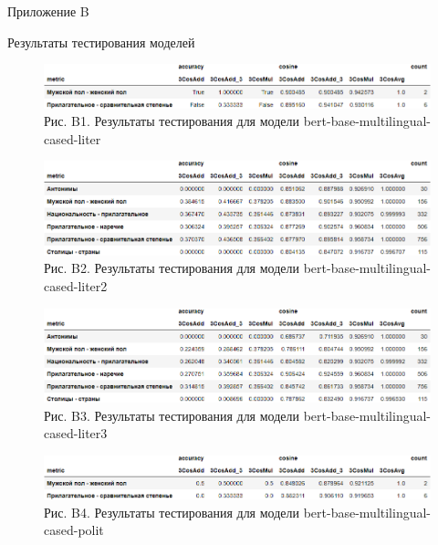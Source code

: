 \documentclass[a4paper,14pt]{article}
\begin{document}
\newpage


\begin{flushright}
	Приложение B
\end{flushright}

\begin{center}
	 Результаты тестирования моделей
\end{center}



\begin{figure}[H]
	\centering
	\includegraphics[width=0.9\linewidth]{image/res_bert-base-multilingual-cased-liter }
	\caption*{Рис. B1. Результаты тестирования для модели bert-base-multilingual-cased-liter }
	\label{fig:resbert-base-multilingual-cased-liter }
\end{figure}

\begin{figure}[H]
	\centering
	\includegraphics[width=0.9\linewidth]{image/res_bert-base-multilingual-cased-liter2 }
	\caption*{Рис. B2. Результаты тестирования для модели bert-base-multilingual-cased-liter2 }
	\label{fig:resbert-base-multilingual-cased-liter2 }
\end{figure}

\begin{figure}[H]
	\centering
	\includegraphics[width=0.9\linewidth]{image/res_bert-base-multilingual-cased-liter3 }
	\caption*{Рис. B3. Результаты тестирования для модели bert-base-multilingual-cased-liter3 }
	\label{fig:resbert-base-multilingual-cased-liter3 }
\end{figure}

\begin{figure}[H]
	\centering
	\includegraphics[width=0.9\linewidth]{image/res_bert-base-multilingual-cased-polit }
	\caption*{Рис. B4. Результаты тестирования для модели bert-base-multilingual-cased-polit }
	\label{fig:resbert-base-multilingual-cased-polit }
\end{figure}
\end{document}
